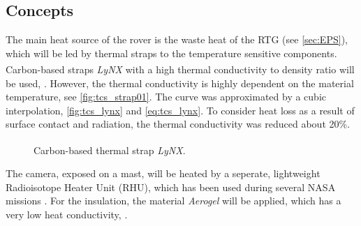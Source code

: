 \subsection{Concepts}
The main heat source of the rover is the waste heat of the RTG (see \autoref{sec:EPS}), which will be led by thermal straps to the temperature sensitive components.
Carbon-based straps \textit{LyNX}\textsuperscript{\tiny\textregistered} with a high thermal conductivity to density ratio will be used, \cite{ref_tcs_01}.
However, the thermal conductivity is highly dependent on the material temperature, see \autoref{fig:tcs_strap01}.
The curve was approximated by  a cubic  interpolation, \autoref{fig:tcs_lynx} and \autoref{eq:tcs_lynx}.
To consider heat loss as a result of surface contact and radiation, the thermal conductivity was reduced about 20\%.
%
\begin{figure}[h]
	\centering
	\qquad\qquad
	\caption{Carbon-based thermal strap \textit{LyNX}\textsuperscript{\tiny\textregistered}.}
	\label{fig:tcs_strap01}
\end{figure}
%
The camera, exposed on a mast, will be heated by a seperate, lightweight Radioisotope Heater Unit (RHU), which has  been used during several NASA missions \cite{ref_tcs_02}.
For the insulation, the material \textit{Aerogel} will be applied, which has a very low heat conductivity, \cite{ref_tcs_03}.

